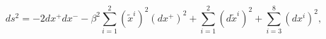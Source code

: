 \begin{equation}
\label{metppd5}
ds^2 = -2 dx^+ dx^- - \beta^2 \sum_{i=1}^2 (\tilde{x}^i)^2 (dx^+)^2
+ \sum_{i=1}^2 (d\tilde{x}^i)^2 + \sum_{i=3}^8 (dx^i)^2,
\end{equation}


